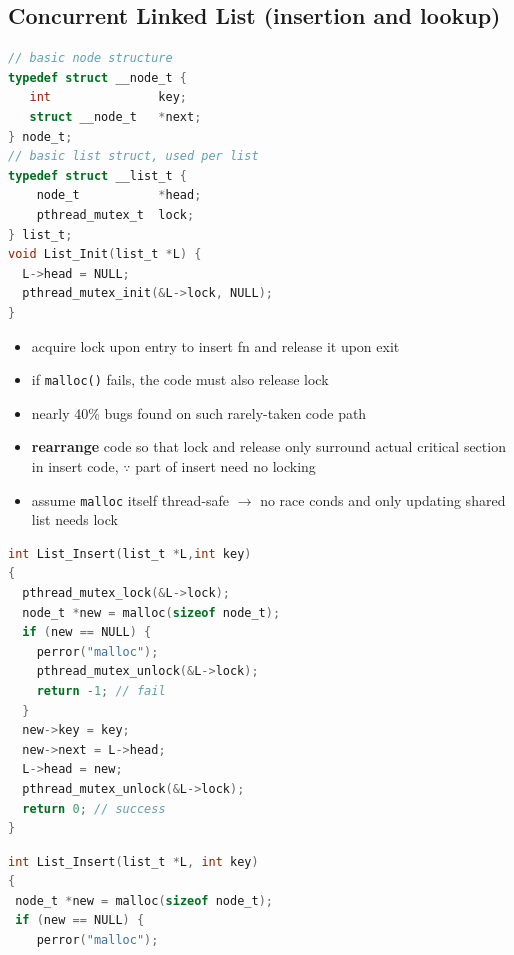 \documentclass[8pt,a4paper,landscape]{extarticle}
\begin{document}
\begin{multicols*}{3}
\section*{Concurrent Linked List (insertion and lookup)}
\begin{minipage}{.52\linewidth}
\begin{lstlisting}[language=c,xleftmargin=-4pt]
// basic node structure
typedef struct __node_t {
   int               key;
   struct __node_t   *next;
} node_t;
// basic list struct, used per list
typedef struct __list_t {
    node_t           *head;
    pthread_mutex_t  lock;
} list_t;
void List_Init(list_t *L) {
  L->head = NULL;
  pthread_mutex_init(&L->lock, NULL);
}
\end{lstlisting}
\end{minipage}
\begin{minipage}{.48\linewidth}
  \flushleft
  \begin{itemize}
  \item acquire lock upon entry to insert fn and release it upon exit
  \item if \texttt{malloc()} fails, the code must also release lock
  \item nearly 40\% bugs found on such rarely-taken code path
  \item \textbf{rearrange} code so that lock and release only surround actual critical section in insert code, $\because$ part of insert need no locking
  \item assume \texttt{malloc} itself thread-safe $\to$ no race conds and only updating shared list needs lock
  \end{itemize}
\end{minipage}
\begin{minipage}{.53\linewidth}
\begin{lstlisting}[language=c,xleftmargin=-4pt]
int List_Insert(list_t *L,int key)
{
  pthread_mutex_lock(&L->lock);
  node_t *new = malloc(sizeof node_t);
  if (new == NULL) {
    perror("malloc");
    pthread_mutex_unlock(&L->lock);
    return -1; // fail
  }
  new->key = key;
  new->next = L->head;
  L->head = new;
  pthread_mutex_unlock(&L->lock);
  return 0; // success
}
\end{lstlisting}
\end{minipage}
\begin{minipage}{.53\linewidth}
\begin{lstlisting}[language=c,xleftmargin=2pt]
int List_Insert(list_t *L, int key)
{
 node_t *new = malloc(sizeof node_t);
 if (new == NULL) {
    perror("malloc");

\end{lstlisting}
\end{minipage}
\end{multicols*}
\end{document}
